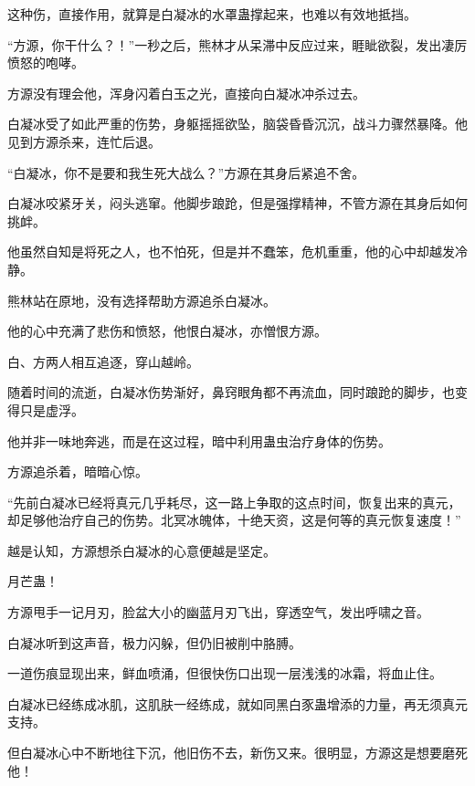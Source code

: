 \begin{this_body}
这种伤，直接作用，就算是白凝冰的水罩蛊撑起来，也难以有效地抵挡。

“方源，你干什么？！”一秒之后，熊林才从呆滞中反应过来，睚眦欲裂，发出凄厉愤怒的咆哮。

方源没有理会他，浑身闪着白玉之光，直接向白凝冰冲杀过去。

白凝冰受了如此严重的伤势，身躯摇摇欲坠，脑袋昏昏沉沉，战斗力骤然暴降。他见到方源杀来，连忙后退。

“白凝冰，你不是要和我生死大战么？”方源在其身后紧追不舍。

白凝冰咬紧牙关，闷头逃窜。他脚步踉跄，但是强撑精神，不管方源在其身后如何挑衅。

他虽然自知是将死之人，也不怕死，但是并不蠢笨，危机重重，他的心中却越发冷静。

熊林站在原地，没有选择帮助方源追杀白凝冰。

他的心中充满了悲伤和愤怒，他恨白凝冰，亦憎恨方源。

白、方两人相互追逐，穿山越岭。

随着时间的流逝，白凝冰伤势渐好，鼻窍眼角都不再流血，同时踉跄的脚步，也变得只是虚浮。

他并非一味地奔逃，而是在这过程，暗中利用蛊虫治疗身体的伤势。

方源追杀着，暗暗心惊。

“先前白凝冰已经将真元几乎耗尽，这一路上争取的这点时间，恢复出来的真元，却足够他治疗自己的伤势。北冥冰魄体，十绝天资，这是何等的真元恢复速度！”

越是认知，方源想杀白凝冰的心意便越是坚定。

月芒蛊！

方源甩手一记月刃，脸盆大小的幽蓝月刃飞出，穿透空气，发出呼啸之音。

白凝冰听到这声音，极力闪躲，但仍旧被削中胳膊。

一道伤痕显现出来，鲜血喷涌，但很快伤口出现一层浅浅的冰霜，将血止住。

白凝冰已经练成冰肌，这肌肤一经练成，就如同黑白豕蛊增添的力量，再无须真元支持。

但白凝冰心中不断地往下沉，他旧伤不去，新伤又来。很明显，方源这是想要磨死他！

\end{this_body}

